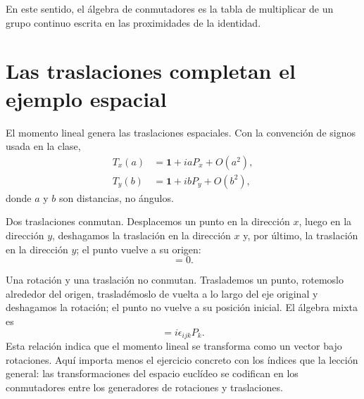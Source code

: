 En este sentido, el álgebra de conmutadores es la tabla de multiplicar de un grupo continuo escrita en las proximidades de la identidad.

\section{Las traslaciones completan el ejemplo espacial}

El momento lineal genera las traslaciones espaciales. Con la convención de signos usada en la clase,
\begin{equation}
\begin{aligned}
T_x(a)&=\mathbf 1+iaP_x+O(a^2),\\
T_y(b)&=\mathbf 1+ibP_y+O(b^2),
\end{aligned}
\end{equation}
donde \(a\) y \(b\) son distancias, no ángulos.

Dos traslaciones conmutan. Desplacemos un punto en la dirección \(x\), luego en la dirección \(y\), deshagamos la traslación en la dirección \(x\) y, por último, la traslación en la dirección \(y\); el punto vuelve a su origen:
\begin{equation}
[P_i,P_j]=0.
\end{equation}

\begin{classroomqa}
\end{classroomqa}

Una rotación y una traslación no conmutan. Traslademos un punto, rotemoslo alrededor del origen, trasladémoslo de vuelta a lo largo del eje original y deshagamos la rotación; el punto no vuelve a su posición inicial. El álgebra mixta es
\begin{equation}
[L_i,P_j]=i\epsilon_{ijk}P_k.
\end{equation}
Esta relación indica que el momento lineal se transforma como un vector bajo rotaciones. Aquí importa menos el ejercicio concreto con los índices que la lección general: las transformaciones del espacio euclídeo se codifican en los conmutadores entre los generadores de rotaciones y traslaciones.


